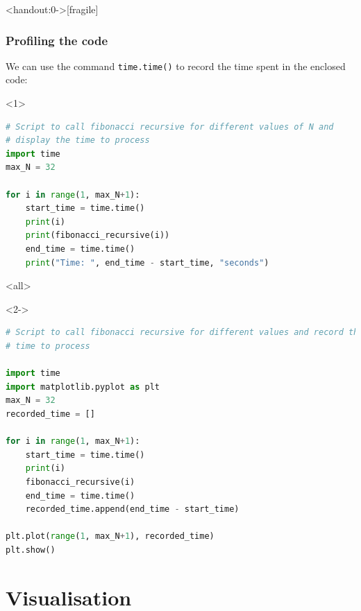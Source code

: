 \begin{frame}<handout:0->[fragile]
  \frametitle{Profiling the code}
  We can use the command \lstinline$time.time()$ to record the time spent in the enclosed code:
    \begin{onlyenv}<1>
      \lstset{showlines=true}
    \begin{lstlisting}[language=Python]
# Script to call fibonacci recursive for different values of N and 
# display the time to process
import time 
max_N = 32

for i in range(1, max_N+1):
    start_time = time.time()
    print(i)
    print(fibonacci_recursive(i))
    end_time = time.time()
    print("Time: ", end_time - start_time, "seconds")
\end{lstlisting}
  \end{onlyenv}
  \mode<all>
  \begin{onlyenv}<2->
    \begin{lstlisting}[language=Python,basicstyle=\scriptsize]
# Script to call fibonacci recursive for different values and record the
# time to process

import time
import matplotlib.pyplot as plt
max_N = 32
recorded_time = []

for i in range(1, max_N+1):
    start_time = time.time()
    print(i)
    fibonacci_recursive(i)
    end_time = time.time()
    recorded_time.append(end_time - start_time)

plt.plot(range(1, max_N+1), recorded_time)
plt.show()
        \end{lstlisting}
      \end{onlyenv}
\end{frame}

\section{Visualisation}
